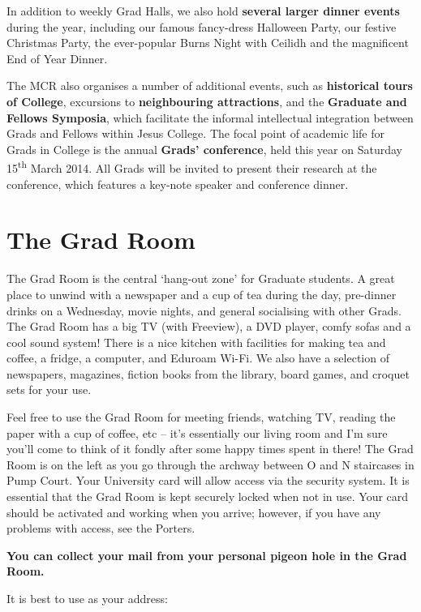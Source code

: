 \documentclass[11pt,fleqn, oneside]{book} %
\begin{document}
In addition to weekly Grad Halls, we also hold \textbf{several larger dinner events} during the year, including our famous fancy-dress Halloween Party, our festive Christmas Party, the ever-popular Burns Night with Ceilidh and the magnificent End of Year Dinner.

The MCR also organises a number of additional events, such as \textbf{historical tours of College}, excursions to \textbf{neighbouring attractions}, and the \textbf{Graduate and Fellows Symposia}, which facilitate the informal intellectual integration between Grads and Fellows within Jesus College.  The focal point of academic life for Grads in College is the annual \textbf{Grads’ conference}, held this year on Saturday 15\textsuperscript{th} March 2014.  All Grads will be invited to present their research at the conference, which features a key-note speaker and conference dinner.

\section{The Grad Room}

The Grad Room is the central ‘hang-out zone’ for Graduate students. A great place to unwind with a newspaper and a cup of tea during the day, pre-dinner drinks on a Wednesday,  movie nights, and general socialising with other Grads. The Grad Room has a big TV (with Freeview), a DVD player, comfy sofas and a cool sound system! There is a nice kitchen with facilities for making tea and coffee, a fridge, a computer, and Eduroam Wi-Fi. We also have a selection of newspapers, magazines, fiction books from the library, board games, and croquet sets for your use.

Feel free to use the Grad Room for meeting friends, watching TV, reading the paper with a cup of coffee, etc – it’s essentially our living room and I’m sure you’ll come to think of it fondly after some happy times spent in there!
The Grad Room is on the left as you go through the archway between O and N staircases in Pump Court. Your University card will allow access via the security system. It is essential that the Grad Room is kept securely locked when not in use. Your card should be activated and working when you arrive; however, if you have any problems with access, see the Porters. 

\textbf{You can collect your mail from your personal pigeon hole in the Grad Room.}


It is best to use as your address:
\end{document}
